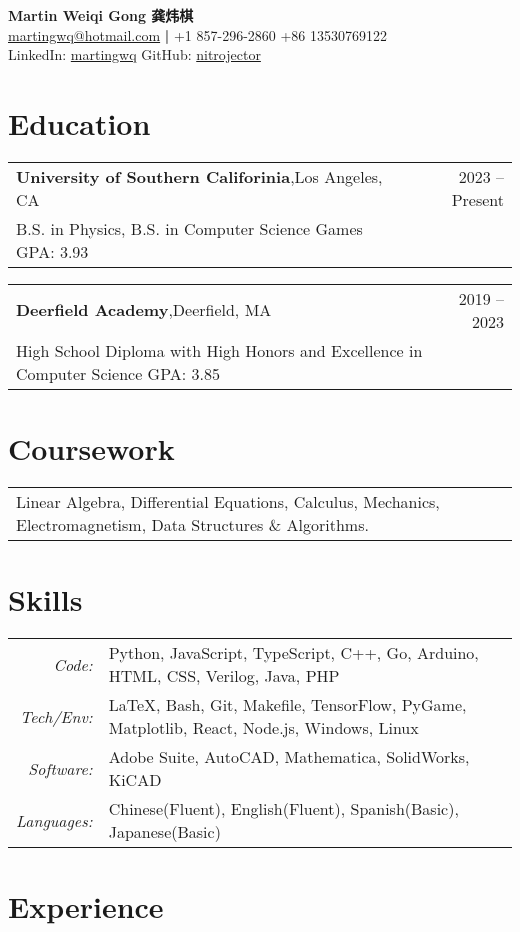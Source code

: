 \documentclass[oneside, 11pt]{article}
\newcommand*{\experienceEntry}[4]{
	\noindent
	\begin{tabularx}{\textwidth}{Xr}
	\textbf{#1},\quad #2 & #3\\
	#4
	\end{tabularx}
	\vspace{-0.75\baselineskip}
}
\begin{document}
\begin{center}
	\Large \textbf{Martin Weiqi Gong 龚炜棋}\\
	\normalsize \href{mailto:martingwq@hotmail.com}{martingwq@hotmail.com} \thinspace \textbf{|} \thinspace +1 857-296-2860 \thinspace +86 13530769122\\
	LinkedIn: \href{https://www.linkedin.com/in/martingwq/}{martingwq} \thinspace GitHub: \href{https://github.com/nitrojector}{nitrojector}
\end{center}

\section*{Education}

\experienceEntry{University of Southern Califorinia}
	{Los Angeles, CA}
	{2023 -- Present}
	{B.S. in Physics, B.S. in Computer Science Games \quad GPA: 3.93}

\experienceEntry{Deerfield Academy}
	{Deerfield, MA}
	{2019 -- 2023}
	{High School Diploma with High Honors and Excellence in Computer Science \quad GPA: 3.85}

\section*{Coursework}

\begin{tabular}{ p{\textwidth - 1em} }
	Linear Algebra, Differential Equations, Calculus, Mechanics, Electromagnetism, Data Structures \& Algorithms.
\end{tabular}

\section*{Skills}

\begin{tabularx}{\textwidth}{rX}
	\textit{Code:} & Python, JavaScript, TypeScript, C++, Go, Arduino, HTML, CSS, Verilog, Java, PHP\\
	\textit{Tech/Env:} & \LaTeX, Bash, Git, Makefile, TensorFlow, PyGame, Matplotlib, React, Node.js, Windows, Linux\\
	\textit{Software:} & Adobe Suite, AutoCAD, Mathematica, SolidWorks, KiCAD\\
	\textit{Languages:} & Chinese(Fluent), English(Fluent), Spanish(Basic), Japanese(Basic)
\end{tabularx}


\section*{Experience}
\end{document}
